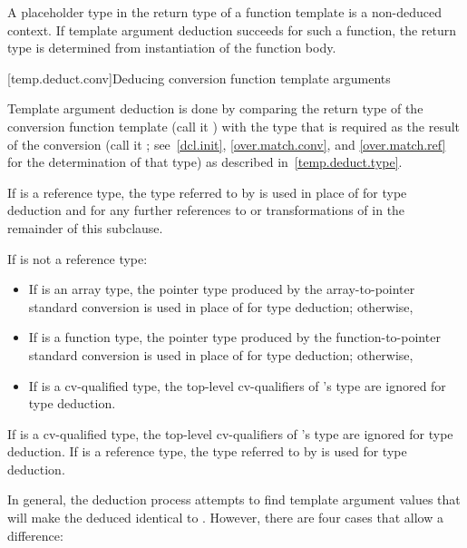 \pnum
A placeholder type in the return type of a
function template is a non-deduced context. If template argument
deduction succeeds for such a function, the return type is determined
from instantiation of the function body.

[temp.deduct.conv]{Deducing conversion function template arguments}

\pnum
Template argument deduction is done by comparing the return type of
the
conversion function template
(call it
)
with the type that is
required as the result of the conversion (call it
; see~\ref{dcl.init}, \ref{over.match.conv}, and \ref{over.match.ref}
for the determination of that type)
as described in~\ref{temp.deduct.type}.

\pnum
If  is a reference type, the type referred to by  is used in place
of  for type deduction and for any further references to or transformations of
 in the remainder of this subclause.

\pnum
If
is not a reference type:

\begin{itemize}
\item
If
is an array type, the pointer type produced by the
array-to-pointer standard conversion is used in place of
for type
deduction; otherwise,
\item
If
is a function type, the pointer type produced by the
function-to-pointer standard conversion is used in place of
for
type deduction; otherwise,
\item
If
is a cv-qualified type, the top-level cv-qualifiers of
's
type are ignored for type deduction.
\end{itemize}

\pnum
If
is a cv-qualified type, the top-level cv-qualifiers of
's
type are ignored for type deduction.
If
is a
reference type, the type referred to by
is used for type deduction.

\pnum
In general, the deduction process attempts to find template argument
values that will make the deduced
identical to
.
However, there are four cases that allow a difference:

